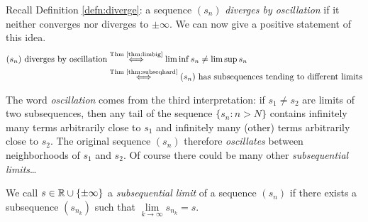 \goodbreak



Recall Definition \ref{defn:diverge}: a sequence $(s_n)$ \emph{diverges by oscillation} if it neither converges nor diverges to $\pm\infty$. We can now give a positive statement of this idea.
\begin{align*}
	(s_n) \text{ diverges by oscillation}
	&\overset{\text{Thm \ref{thm:limbig}}}{\iff} \liminf s_n\neq \limsup s_n\\
	&\overset{\text{Thm \ref{thm:subseqhard}}}{\iff}(s_n) \text{ has subsequences tending to different limits}
\end{align*}

The word \emph{oscillation} comes from the third interpretation: if $s_1\neq s_2$ are limits of two subsequences, then any tail of the sequence $\{s_n:n>N\}$ contains infinitely many terms arbitrarily close to $s_1$ and infinitely many (other) terms arbitrarily close to $s_2$. The original sequence $(s_n)$ therefore \emph{oscillates} between neighborhoods of $s_1$ and $s_2$. Of course there could be many other \emph{subsequential limits}\ldots


\begin{defn}{}{}
	We call $s\in\mathbb{R}\cup\{\pm\infty\}$ a \emph{subsequential limit} of a sequence $(s_n)$ if there exists a subsequence $(s_{n_k})$ such that $\lim\limits_{k\to\infty}s_{n_k}=s$.
\end{defn}

